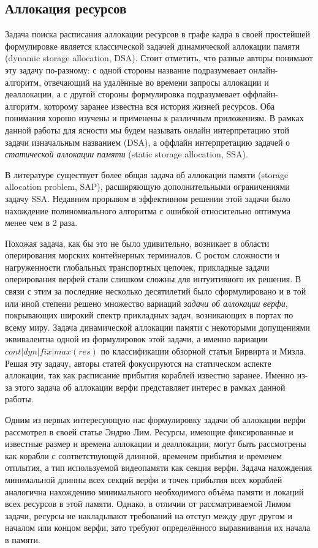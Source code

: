 \subsection{Аллокация ресурсов}
Задача поиска расписания аллокации ресурсов в графе кадра в своей простейшей формулировке является классической задачей динамической аллокации памяти (dynamic storage allocation, DSA\cite[стр. 226]{10.5555/574848}). Стоит отметить, что разные авторы понимают эту задачу по-разному: с одной стороны название подразумевает онлайн-алгоритм, отвечающий на удалённые во времени запросы аллокации и деаллокации, а с другой стороны формулировка подразумевает оффлайн-алгоритм, которому заранее известна вся история жизней ресурсов. Оба понимания хорошо изучены и применены к различным приложениям. В рамках данной работы для ясности мы будем называть онлайн интерпретацию этой задачи изначальным названием (DSA), а оффлайн интерпретацию задачей о \textit{статической аллокации памяти} (static storage allocation, SSA).

В литературе существует более общая задача об аллокации памяти (storage allocation problem, SAP), расширяющую дополнительными ограничениями задачу SSA. Недавним прорывом в эффективном решении этой задачи было нахождение полиномиального алгоритма с ошибкой относительно оптимума менее чем в 2 раза\cite{https://doi.org/10.48550/arxiv.1911.10871}.

Похожая задача, как бы это не было удивительно, возникает в области оперирования морских контейнерных терминалов. С ростом сложности и нагруженности глобальных транспортных цепочек, прикладные задачи оперирования верфей стали слишком сложны для интуитивного их решения. В связи с этим за последние несколько десятилетий было сформулировано и в той или иной степени решено множество вариаций \textit{задачи об аллокации верфи}, покрывающих широкий спектр прикладных задач, возникающих в портах по всему миру. Задача динамической аллокации памяти с некоторыми допущениями эквивалентна одной из формулировок этой задачи, а именно вариации $cont|dyn|fix|max(res)$ по классификации обзорной статьи Бирвирта и Мизла\cite{BIERWIRTH2010615}. Решая эту задачу, авторы статей фокусируются на статическом аспекте аллокации, так как расписание прибытия кораблей известно заранее. Именно из-за этого задача об аллокации верфи представляет интерес в рамках данной работы.

Одним из первых интересующую нас формулировку задачи об аллокации верфи рассмотрел в своей статье Эндрю Лим\cite{LIM1998105}. Ресурсы, имеющие фиксированные и известные размер и времена аллокации и деаллокации, могут быть рассмотрены как корабли с соответствующей длинной, временем прибытия и временем отплытия, а тип используемой видеопамяти как секция верфи. Задача нахождения минимальной длинны всех секций верфи и точек прибытия всех кораблей аналогична нахождению минимального необходимого объёма памяти и локаций всех ресурсов в этой памяти. Однако, в отличии от рассматриваемой Лимом задачи, ресурсы не накладывают требований на отступ между друг другом и началом или концом верфи, зато требуют определённого выравнивания их начала в памяти. 

